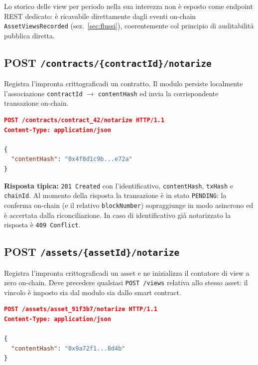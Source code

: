 \documentclass[a4paper,11pt]{article}
\begin{document}
\noindent Lo storico delle view per periodo nella sua interezza non \`e esposto come endpoint REST dedicato: \`e ricavabile direttamente dagli eventi on-chain \texttt{AssetViewsRecorded} (sez.~\ref{sec:flussi}), coerentemente col principio di auditabilit\`a pubblica diretta.

\subsection{POST \texttt{/contracts/\{contractId\}/notarize}}

Registra l'impronta crittograficadi un contratto. Il modulo persiste localmente l'associazione \texttt{contractId} \(\to\) \texttt{contentHash} ed invia la corrispondente transazione on-chain.

\begin{lstlisting}[language=json, caption={Esempio di richiesta a \texttt{POST /contracts/\{id\}/notarize}.}]
POST /contracts/contract_42/notarize HTTP/1.1
Content-Type: application/json

{
  "contentHash": "0x4f8d1c9b...e72a"
}
\end{lstlisting}

\noindent \textbf{Risposta tipica:} \texttt{201 Created} con l'identificativo, \texttt{contentHash}, \texttt{txHash} e \texttt{chainId}. Al momento della risposta la transazione \`e in stato \texttt{PENDING}: la conferma on-chain (e il relativo \texttt{blockNumber}) sopraggiunge in modo asincrono ed \`e accertata dalla riconciliazione. In caso di identificativo gi\`a notarizzato la risposta \`e \texttt{409 Conflict}.

\subsection{POST \texttt{/assets/\{assetId\}/notarize}}

Registra l'impronta crittograficadi un asset e ne inizializza il contatore di view a zero on-chain. Deve precedere qualsiasi \texttt{POST /views} relativa allo stesso asset: il vincolo \`e imposto sia dal modulo sia dallo smart contract.

\begin{lstlisting}[language=json, caption={Esempio di richiesta a \texttt{POST /assets/\{id\}/notarize}.}]
POST /assets/asset_91f3b7/notarize HTTP/1.1
Content-Type: application/json

{
  "contentHash": "0x9a72f1...8d4b"
}
\end{lstlisting}
\end{document}
